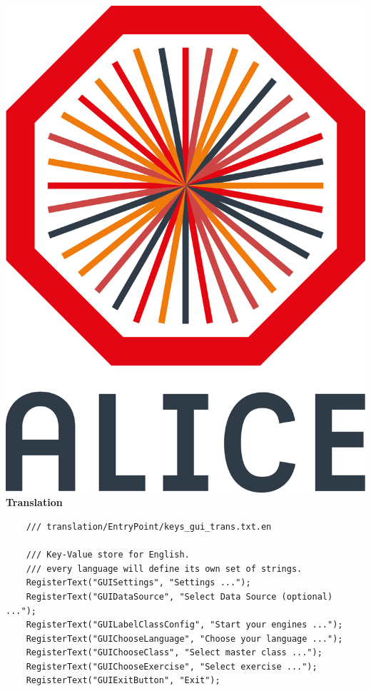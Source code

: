 \documentclass[aspectratio=1610,14pt,dvipsnames]{beamer}
\begin{document}
\begin{frame}[fragile]{\includegraphics[height=0.07\textheight]{2012-Jul-04-4_Color_Logo_CB.png} \hspace{0.2cm}\textbf{Translation}}
  \begin{verbatim}
    /// translation/EntryPoint/keys_gui_trans.txt.en

    /// Key-Value store for English.
    /// every language will define its own set of strings.
    RegisterText("GUISettings", "Settings ...");
    RegisterText("GUIDataSource", "Select Data Source (optional) ...");
    RegisterText("GUILabelClassConfig", "Start your engines ...");
    RegisterText("GUIChooseLanguage", "Choose your language ...");
    RegisterText("GUIChooseClass", "Select master class ...");
    RegisterText("GUIChooseExercise", "Select exercise ...");
    RegisterText("GUIExitButton", "Exit");
  \end{verbatim}
\end{frame}
\end{document}

